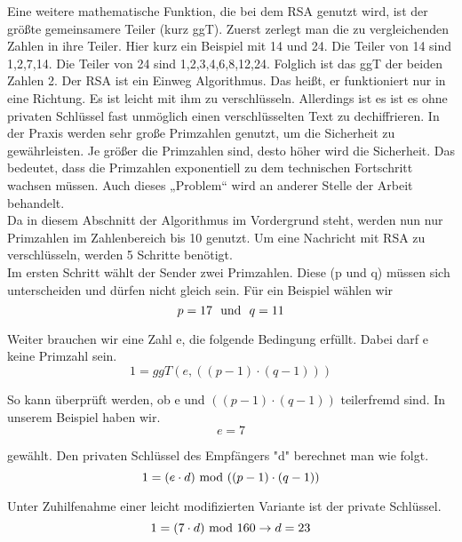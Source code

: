 Eine weitere mathematische Funktion, die bei dem RSA genutzt wird, ist der größte gemeinsamere Teiler (kurz ggT). Zuerst zerlegt man die zu vergleichenden Zahlen in ihre Teiler. Hier kurz ein Beispiel mit 14 und 24. Die Teiler von 14 sind 1,2,7,14. Die Teiler von 24 sind 1,2,3,4,6,8,12,24. Folglich ist das ggT der beiden Zahlen 2.
Der RSA ist ein Einweg Algorithmus. Das heißt, er funktioniert nur in eine Richtung. Es ist leicht mit ihm zu verschlüsseln. Allerdings ist es ist es ohne privaten Schlüssel fast unmöglich einen verschlüsselten Text zu dechiffrieren. In der Praxis werden sehr große Primzahlen genutzt, um die Sicherheit zu gewährleisten. Je größer die Primzahlen sind, desto höher wird die Sicherheit. Das bedeutet, dass die Primzahlen exponentiell zu dem technischen Fortschritt wachsen müssen. Auch dieses „Problem“ wird an anderer Stelle der Arbeit behandelt.\\
Da in diesem Abschnitt der Algorithmus im Vordergrund steht, werden nun nur Primzahlen im Zahlenbereich bis 10 genutzt.
Um eine Nachricht mit RSA zu verschlüsseln, werden 5 Schritte benötigt.\\
Im ersten Schritt wählt der Sender zwei Primzahlen. Diese (p und q) müssen sich unterscheiden und dürfen nicht gleich sein. Für ein Beispiel wählen wir\\	
\begin{equation}
	p=17 \textmd{~ und ~}q=11
\end{equation}

Weiter brauchen wir eine Zahl e, die folgende Bedingung erfüllt. Dabei darf e keine Primzahl sein. \\
\begin{equation}
	1 = ggT(e,((p-1) \cdot (q-1)))
\end{equation}

So kann überprüft werden, ob e und $((p-1)\cdot (q-1))$ teilerfremd sind. In unserem Beispiel haben wir.
\begin{equation}
	e=7
\end{equation}

gewählt. Den privaten Schlüssel des Empfängers "d" berechnet man wie folgt.
\begin{equation}
	1 = (e \cdot d)\textmd{~mod~}((p-1)\cdot(q-1))
\end{equation}

Unter Zuhilfenahme einer leicht modifizierten Variante ist der private Schlüssel.\\
\begin{equation}
	1 = (7 \cdot d) \textmd{~mod~}160 \rightarrow d=23
\end{equation}

